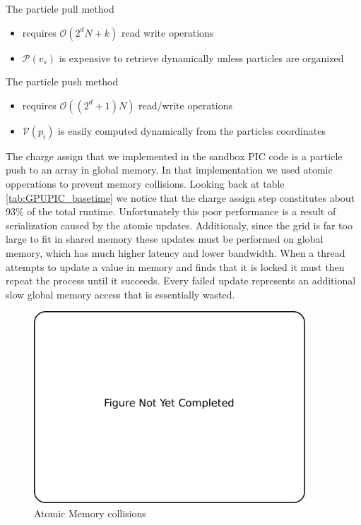 The particle pull method
\begin{itemize}
\item requires $\mathcal{O}(2^dN + k)$ read write operations
\item $\mathcal{P}(v_s)$ is expensive to retrieve dynamically unless particles are organized
\end{itemize}

The particle push method
\begin{itemize}
\item requires $\mathcal{O}((2^d+1)N)$ read/write operations
\item $\mathcal{V}(p_i)$ is easily computed dynamically from the particles coordinates
\end{itemize}

The charge assign that we implemented in the sandbox PIC code is a particle push to an array in global memory. In that implementation we used atomic opperations to prevent memory collisions. Looking back at table \ref{tab:GPUPIC_basetime} we notice that the charge assign step constitutes about 93\% of the total runtime.  Unfortunately this poor performance is a result of serialization caused by the atomic updates. Additionaly, since the grid is far too large to fit in shared memory these updates must be performed on global memory, which has much higher latency and lower bandwidth. When a thread attempts to update a value in memory and finds that it is locked it must then repeat the process until it succeeds. Every failed update represents an additional slow global memory access that is essentially wasted. 

\begin{figure}
\begin{center}
\includegraphics[width=4in]{introduction/not_finished.pdf}
\end{center}
\caption{Atomic Memory collisions}
\label{fig:pic_flowchart_parallel}
\end{figure}

